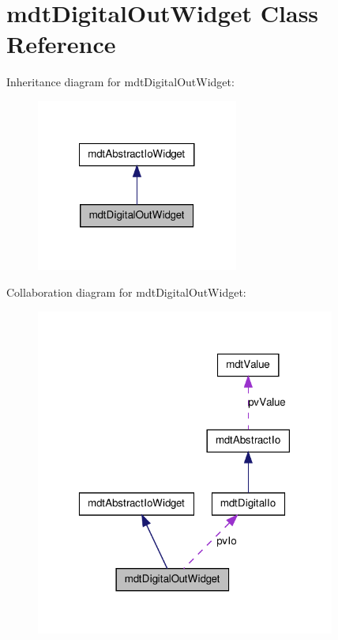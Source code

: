 \hypertarget{classmdt_digital_out_widget}{
\section{mdtDigitalOutWidget Class Reference}
\label{classmdt_digital_out_widget}
}


Inheritance diagram for mdtDigitalOutWidget:\nopagebreak
\begin{figure}[H]
\begin{center}
\leavevmode
\includegraphics[width=188pt]{classmdt_digital_out_widget__inherit__graph}
\end{center}
\end{figure}


Collaboration diagram for mdtDigitalOutWidget:
\nopagebreak
\begin{figure}[H]
\begin{center}
\leavevmode
\includegraphics[width=279pt]{classmdt_digital_out_widget__coll__graph}
\end{center}
\end{figure}
